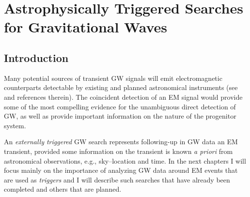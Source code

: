 \chapter{Astrophysically Triggered Searches for Gravitational Waves} %
\label{Chapter Two}

\section{Introduction}

Many potential sources of transient \ac{GW} signals will emit electromagnetic counterparts detectable by existing and planned astronomical instruments (see \cite{Centrella:2011nh, Metzger:2011bv, Predoi:2009af} and references therein). The coincident detection of an \ac{EM} signal would provide some of the most compelling evidence for the unambiguous direct detection of \ac{GW}, as well as provide important information on the nature of the progenitor system.

An \emph{externally triggered} \ac{GW} search represents following-up in \ac{GW} data an \ac{EM} transient, provided some information on the transient is known \emph{a priori} from astronomical observations, e.g., sky--location and time. In the next chapters I will focus mainly on the importance of analyzing \ac{GW} data around \ac{EM} events that are used as \emph{triggers} and I will describe such searches that have already been completed and others that are planned.

